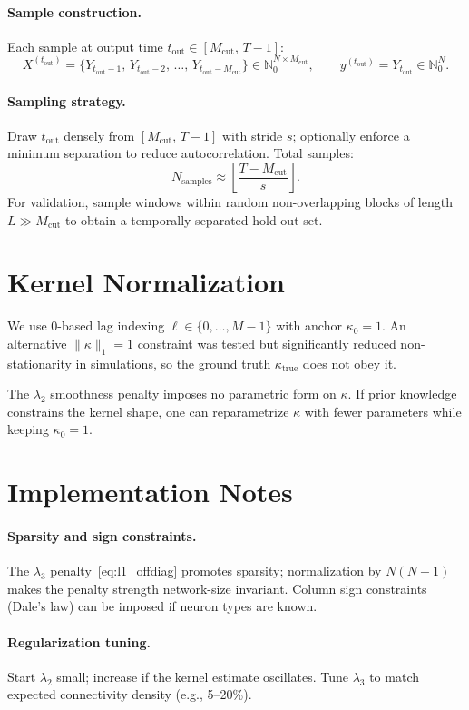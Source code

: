\documentclass[11pt]{article}
\begin{document}
\paragraph{Sample construction.}
Each sample at output time \(t_{\mathrm{out}} \in [M_{\mathrm{cut}},\, T-1]\):
\[
X^{(t_{\mathrm{out}})} = \big\{Y_{t_{\mathrm{out}}-1},\, Y_{t_{\mathrm{out}}-2},\, \dots,\, Y_{t_{\mathrm{out}}-M_{\mathrm{cut}}}\big\} \in \mathbb{N}_0^{N \times M_{\mathrm{cut}}},
\qquad
y^{(t_{\mathrm{out}})} = Y_{t_{\mathrm{out}}} \in \mathbb{N}_0^{N}.
\]

\paragraph{Sampling strategy.}
Draw \(t_{\mathrm{out}}\) densely from \([M_{\mathrm{cut}},\, T-1]\) with stride \(s\); optionally enforce a minimum separation to reduce autocorrelation. Total samples:
\[
N_{\mathrm{samples}} \approx \left\lfloor \frac{T - M_{\mathrm{cut}}}{s} \right\rfloor.
\]
For validation, sample windows within random non-overlapping blocks of length \(L \gg M_{\mathrm{cut}}\) to obtain a temporally separated hold-out set.

\section{Kernel Normalization}
\label{sec:lags}

We use 0-based lag indexing \(\ell \in \{0,\dots,M-1\}\) with anchor \(\kappa_0=1\). An alternative \(\|\kappa\|_1=1\) constraint was tested but significantly reduced non-stationarity in simulations, so the ground truth \(\kappa_{\mathrm{true}}\) does not obey it.

The \(\lambda_2\) smoothness penalty imposes no parametric form on \(\kappa\). If prior knowledge constrains the kernel shape, one can reparametrize \(\kappa\) with fewer parameters while keeping \(\kappa_0=1\).

\section{Implementation Notes}
\label{sec:practical}

\paragraph{Sparsity and sign constraints.}
The \(\lambda_3\) penalty~\eqref{eq:l1_offdiag} promotes sparsity; normalization by \(N(N-1)\) makes the penalty strength network-size invariant. Column sign constraints (Dale's law) can be imposed if neuron types are known.

\paragraph{Regularization tuning.}
Start \(\lambda_2\) small; increase if the kernel estimate oscillates. Tune \(\lambda_3\) to match expected connectivity density (e.g., 5--20\%).
\end{document}
